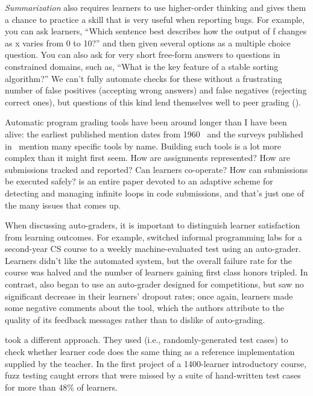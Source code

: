 \emph{Summarization} also requires learners to use higher-order thinking
and gives them a chance to practice a skill that is very useful when reporting bugs.
For example,
you can ask learners,
``Which sentence best describes how the output of f changes as x varies from 0 to 10?''
and then given several options as a multiple choice question.
You can also ask for very short free-form answers to questions in constrained domains,
such as, ``What is the key feature of a stable sorting algorithm?''
We can't fully automate checks for these without a frustrating number of false positives (accepting wrong answers)
and false negatives (rejecting correct ones),
but questions of this kind lend themselves well to peer grading ().


Automatic program grading tools have been around longer than I have been alive:
the earliest published mention dates from 1960~\cite{Holl1960}
and the surveys published in~\cite{Douc2005,Ihan2010} mention many specific tools by name.
Building such tools is a lot more complex than it might first seem.
How are assignments represented?
How are submissions tracked and reported?
Can learners co-operate?
How can submissions be executed safely?
\cite{Edwa2014a} is an entire paper devoted to
an adaptive scheme for detecting and managing infinite loops in code submissions,
and that's just one of the many issues that comes up.

When discussing auto-graders,
it is important to distinguish learner satisfaction from learning outcomes.
For example,
\cite{Magu2018} switched informal programming labs for a second-year CS course
to a weekly machine-evaluated test using an auto-grader.
Learners didn't like the automated system,
but the overall failure rate for the course was halved
and the number of learners gaining first class honors tripled.
In contrast,
\cite{Rubi2014} also began to use an auto-grader designed for competitions,
but saw no significant decrease in their learners' dropout rates;
once again,
learners made some negative comments about the tool,
which the authors attribute to the quality of its feedback messages
rather than to dislike of auto-grading.

\cite{Srid2016} took a different approach.
They used 
(i.e., randomly-generated test cases)
to check whether learner code does the same thing as a reference implementation supplied by the teacher.
In the first project of a 1400-learner introductory course,
fuzz testing caught errors that were missed by a suite of hand-written test cases
for more than 48\% of learners.

